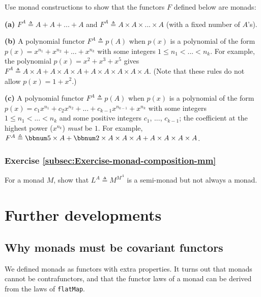 Use monad constructions to show that the functors $F$ defined below
are monads:

\textbf{(a)} $F^{A}\triangleq A+A+...+A$ and $F^{A}\triangleq A\times A\times...\times A$
(with a fixed number of $A$\textsf{'}s).

\textbf{(b)} A polynomial functor $F^{A}\triangleq p(A)$ when $p(x)$
is a polynomial of the form $p(x)=x^{n_{1}}+x^{n_{2}}+...+x^{n_{k}}$
with some integers $1\leq n_{1}<...<n_{k}$. For example, the polynomial
$p(x)=x^{2}+x^{3}+x^{5}$ gives $F^{A}\triangleq A\times A+A\times A\times A+A\times A\times A\times A\times A$.
(Note that these rules do not allow $p(x)=1+x^{2}$.)

\textbf{(c)} A polynomial functor $F^{A}\triangleq p(A)$ when $p(x)$
is a polynomial of the form $p(x)=c_{1}x^{n_{1}}+c_{2}x^{n_{2}}+...+c_{k-1}x^{n_{k-1}}+x^{n_{k}}$
with some integers $1\leq n_{1}<...<n_{k}$ and some positive integers
$c_{1}$, ..., $c_{k-1}$; the coefficient at the highest power ($x^{n_{k}}$)
\emph{must} be $1$. For example, $F^{A}\triangleq\bbnum 5\times A+\bbnum 2\times A\times A\times A+A\times A\times A\times A$.

\subsubsection{Exercise \label{subsec:Exercise-monad-composition-mm}\ref{subsec:Exercise-monad-composition-mm}}

For a monad $M$, show that $L^{A}\triangleq M^{M^{A}}$ is a semi-monad
but not always a monad.

\section{Further developments}

\subsection{Why monads must be covariant functors}

We defined monads as functors with extra properties. It turns out
that monads cannot be contrafunctors, and that the functor laws of
a monad can be derived from the laws of \lstinline!flatMap!.

